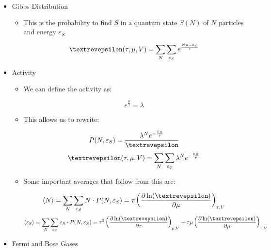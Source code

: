 \begin{itemize}

  \item Gibbs Distribution

    \begin{itemize}

        $$P(N,\varepsilon_S)=\frac{e^{\frac{N\mu-\varepsilon_S}{\tau}}}{\text{\textrevepsilon}}$$

      \item This is the probability to find $S$ in a quantum state $S(N)$ of $N$ particles and energy $\varepsilon_S$

        $$\text{\textrevepsilon}(\tau,\mu,V)=\sum_N\sum_{\varepsilon_S}e^{\frac{N\mu-\varepsilon_S}{\tau}}$$

    \end{itemize}

  \item Activity

    \begin{itemize}

      \item We can define the activity as:

        $$e^{\frac{\mu}{\tau}}=\lambda$$

      \item This allows us to rewrite:

        $$P(N,\varepsilon_S)=\frac{\lambda^Ne^{-\frac{\varepsilon_S}{\tau}}}{\text{\textrevepsilon}}$$
        $$\text{\textrevepsilon}(\tau,\mu,V)=\sum_N\sum_{\varepsilon_S}\lambda^N e^{-\frac{\varepsilon_S}{\tau}}$$

      \item Some important averages that follow from this are:

        $$\langle N\rangle=\sum_N\sum_{\varepsilon_S}N\cdot P(N,\varepsilon_S)=\tau\left(\frac{\partial \ln(\text{\textrevepsilon})}{\partial \mu}\right)_{\tau,V}$$
        $$\langle \varepsilon_S\rangle=\sum_N\sum_{\varepsilon_S}\varepsilon_S\cdot P(N,\varepsilon_S)=\tau^2\left(\frac{\partial \ln(\text{\textrevepsilon})}{\partial \tau}\right)_{\mu,V}+\tau\mu\left( \frac{\partial \ln(\text{\textrevepsilon})}{\partial \mu} \right)_{\tau,V}$$

    \end{itemize}

  \item Fermi and Bose Gases

    \begin{itemize}


\end{itemize}
\end{itemize}
